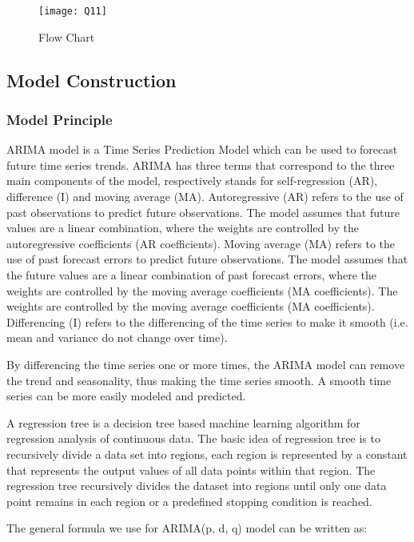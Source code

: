 \documentclass{mcmthesis}
\begin{document}
\begin{figure}[h]
\small
\centering
\texttt{[image: Q11]}
\caption{Flow Chart} \label{fig:aa}
\end{figure}

\subsection{Model Construction}

\subsubsection{Model Principle}

\hspace*{0.6cm}ARIMA model is a Time Series Prediction Model which can be used to forecast future time series trends. ARIMA has three terms that correspond to the three main components of the model, respectively stands for self-regression (AR), difference (I) and moving average (MA). Autoregressive (AR) refers to the use of past observations to predict future observations. The model assumes that future values are a linear combination, where the weights are controlled by the autoregressive coefficients (AR coefficients). Moving average (MA) refers to the use of past forecast errors to predict future observations. The model assumes that the future values are a linear combination of past forecast errors, where the weights are controlled by the moving average coefficients (MA coefficients). The weights are controlled by the moving average coefficients (MA coefficients). Differencing (I) refers to the differencing of the time series to make it smooth (i.e. mean and variance do not change over time). 

By differencing the time series one or more times, the ARIMA model can remove the trend and seasonality, thus making the time series smooth. A smooth time series can be more easily modeled and predicted. 

A regression tree is a decision tree based machine learning algorithm for regression analysis of continuous data. The basic idea of regression tree is to recursively divide a data set into regions, each region is represented by a constant that represents the output values of all data points within that region. The regression tree recursively divides the dataset into regions until only one data point remains in each region or a predefined stopping condition is reached.

The general formula we use for ARIMA(p, d, q) model can be written as:
\end{document}

